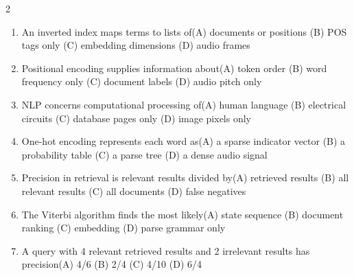 \documentclass[a4paper]{article}
\begin{document}
\begin{multicols*}{2}
\begin{enumerate}
\item An inverted index maps terms to lists of\newline\hspace*{0.6em}(A) documents or positions \quad (B) POS tags only \newline\hspace*{0.6em}(C) embedding dimensions \quad (D) audio frames
\item Positional encoding supplies information about\newline\hspace*{0.6em}(A) token order \quad (B) word frequency only \newline\hspace*{0.6em}(C) document labels \quad (D) audio pitch only
\item NLP concerns computational processing of\newline\hspace*{0.6em}(A) human language \quad (B) electrical circuits \newline\hspace*{0.6em}(C) database pages only \quad (D) image pixels only
\item One-hot encoding represents each word as\newline\hspace*{0.6em}(A) a sparse indicator vector \quad (B) a probability table \newline\hspace*{0.6em}(C) a parse tree \quad (D) a dense audio signal
\item Precision in retrieval is relevant results divided by\newline\hspace*{0.6em}(A) retrieved results \quad (B) all relevant results \newline\hspace*{0.6em}(C) all documents \quad (D) false negatives
\item The Viterbi algorithm finds the most likely\newline\hspace*{0.6em}(A) state sequence \quad (B) document ranking \newline\hspace*{0.6em}(C) embedding \quad (D) parse grammar only
\item A query with 4 relevant retrieved results and 2 irrelevant results has precision\newline\hspace*{0.6em}(A) 4/6 \quad (B) 2/4 \newline\hspace*{0.6em}(C) 4/10 \quad (D) 6/4

\end{enumerate}
\end{multicols*}
\end{document}
